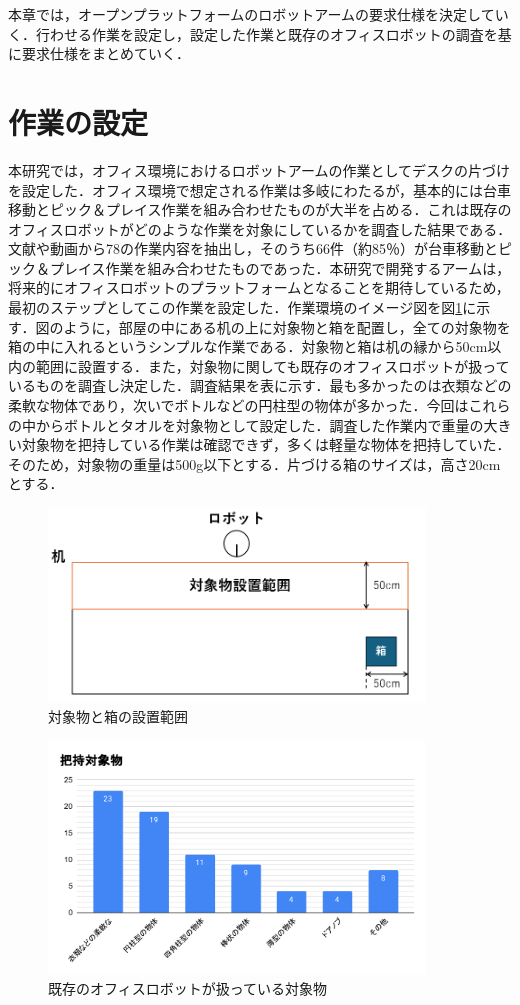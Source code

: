 本章では，オープンプラットフォームのロボットアームの要求仕様を決定していく．行わせる作業を設定し，設定した作業と既存のオフィスロボットの調査を基に要求仕様をまとめていく．
\section{作業の設定}
本研究では，オフィス環境におけるロボットアームの作業としてデスクの片づけを設定した．オフィス環境で想定される作業は多岐にわたるが，基本的には台車移動とピック＆プレイス作業を組み合わせたものが大半を占める．これは既存のオフィスロボットがどのような作業を対象にしているかを調査した結果である．文献や動画から78の作業内容を抽出し，そのうち66件（約85％）が台車移動とピック＆プレイス作業を組み合わせたものであった．本研究で開発するアームは，将来的にオフィスロボットのプラットフォームとなることを期待しているため，最初のステップとしてこの作業を設定した．作業環境のイメージ図を図\ref{fig:range}に示す．図のように，部屋の中にある机の上に対象物と箱を配置し，全ての対象物を箱の中に入れるというシンプルな作業である．対象物と箱は机の縁から50cm以内の範囲に設置する．また，対象物に関しても既存のオフィスロボットが扱っているものを調査し決定した．調査結果を表に示す．最も多かったのは衣類などの柔軟な物体であり，次いでボトルなどの円柱型の物体が多かった．今回はこれらの中からボトルとタオルを対象物として設定した．調査した作業内で重量の大きい対象物を把持している作業は確認できず，多くは軽量な物体を把持していた．そのため，対象物の重量は500g以下とする．片づける箱のサイズは，高さ20cmとする．
\begin{figure}[h]
  \centering
  \includegraphics[width=10cm]{images/range.png}
  \caption{対象物と箱の設置範囲}
  \label{fig:range}
\end{figure}
\begin{figure}[h]
  \centering
  \includegraphics[width=10cm]{images/handget.pdf}
  \caption{既存のオフィスロボットが扱っている対象物}
  \label{fig:handget}
\end{figure}
\newpage